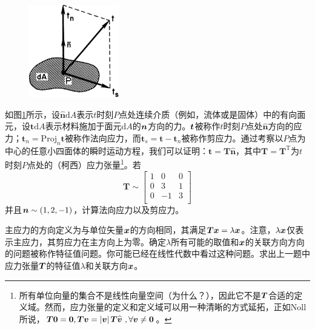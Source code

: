 \begin{exercise}
    \begin{figure}[htbp]
        \centering
        \includegraphics[width=0.35\textwidth]{./image/1.10.png}
        \caption{}
        \label{fig:1.10}
    \end{figure}

    \item 如图\ref{fig:1.10}所示，设$\widehat{\boldsymbol{n}}\mathrm{d}A$表示$t$时刻$P$点处连续介质（例如，流体或是固体）中的有向面元，设$\boldsymbol{t}\mathrm{d}A$表示材料施加于面元$\mathrm{d}A$的$\bb{n}$方向的力。$\bb{t}$被称作$t$时刻$P$点处$\widehat{\boldsymbol{n}}$方向的应力；$\boldsymbol{t}_n=\mathrm{Proj}_n\boldsymbol{t}$被称作法向应力，而$\boldsymbol{t}_s=\boldsymbol{t}-\boldsymbol{t}_n$被称作剪应力。通过考察以$P$点为中心的任意小四面体的瞬时运动方程，我们可以证明：$\boldsymbol{t}=\boldsymbol{T}\widehat{\boldsymbol{n}}$，其中$\boldsymbol{T}=\boldsymbol{T}^{\mathrm{T}}$为$t$时刻$P$点处的（柯西）应力张量\footnote{所有单位向量的集合不是线性向量空间（为什么？），因此它不是$\bb{T}$合适的定义域。然而，应力张量的定义和定义域可以用一种清晰的方式延拓，正如Noll所说，$\boldsymbol{T}\bf{0}=\bf{0},\boldsymbol{Tv}=\left| \boldsymbol{v} \right|\boldsymbol{T}\widehat{\boldsymbol{v}}\,\, ,\forall \boldsymbol{v}\ne \bf{0}$。}。若
    \begin{equation*}
        \boldsymbol{T}\sim \left[ \begin{matrix}
            1&		0&		0\\
            0&		3&		1\\
            0&		-1&		3\\
        \end{matrix} \right] 
    \end{equation*}
    并且$\bb{n}\sim (1,2,-1)$，计算法向应力以及剪应力。
    \item 主应力的方向定义为与单位矢量$\bb{x}$的方向相同，其满足$\bb{Tx}=\lambda\bb{x}$。注意，$\lambda\bb{x}$仅表示主应力，其剪应力在主方向上为零。确定$\lambda$所有可能的取值和$\bb{x}$的关联方向方向的问题被称作特征值问题。你可能已经在线性代数中看过这种问题。求出上一题中应力张量$\bb{T}$的特征值$\lambda$和关联方向$\bb{x}$。

\end{exercise}
